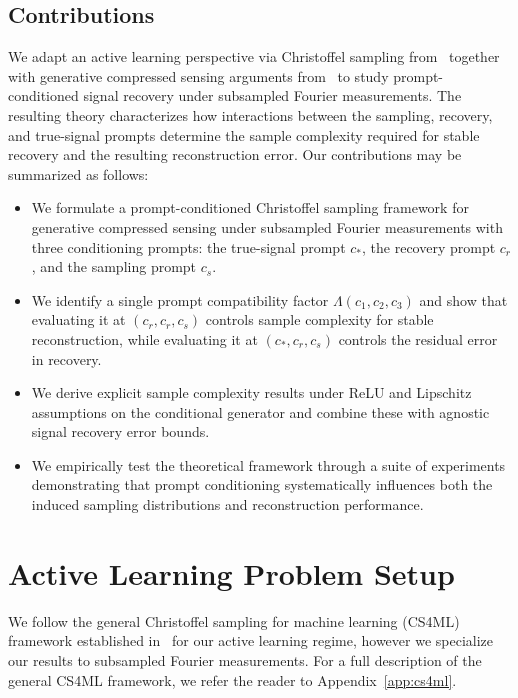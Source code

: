 \documentclass{article}
\theoremstyle{plain}
\theoremstyle{definition}
\theoremstyle{remark}
\begin{document}
\subsection{Contributions}
We adapt an active learning perspective via Christoffel sampling from~\cite{adcock2023cs4ml} together with generative compressed sensing arguments from~\cite{bora2017compressed, berk2023modeladapted, berk2022fourier} to study prompt-conditioned signal recovery under subsampled Fourier measurements. The resulting theory characterizes how interactions between the sampling, recovery, and true-signal prompts determine the sample complexity required for stable recovery and the resulting reconstruction error. Our contributions may be summarized as follows:
\begin{itemize}
    \item We formulate a prompt-conditioned Christoffel sampling framework for generative compressed sensing under subsampled Fourier measurements with three conditioning prompts: the true-signal prompt $c_*$, the recovery prompt $c_r$, and the sampling prompt $c_s$.

    \item We identify a single prompt compatibility factor $\Lambda(c_1,c_2,c_3)$ and show that evaluating it at $(c_r,c_r,c_s)$ controls sample complexity for stable reconstruction, while evaluating it at $(c_*,c_r,c_s)$ controls the residual error in recovery.

    \item We derive explicit sample complexity results under ReLU and Lipschitz assumptions on the conditional generator and combine these with agnostic signal recovery error bounds.

    \item We empirically test the theoretical framework through a suite of experiments demonstrating that prompt conditioning systematically influences both the induced sampling distributions and reconstruction performance.
\end{itemize}

\section{Active Learning Problem Setup}\label{sec: problem setup}

We follow the general Christoffel sampling for machine learning (CS4ML) framework established in~\cite{adcock2023cs4ml} for our active learning regime, however we specialize our results to subsampled Fourier measurements. For a full description of the general CS4ML framework, we refer the reader to Appendix~\ref{app:cs4ml}.
\end{document}
